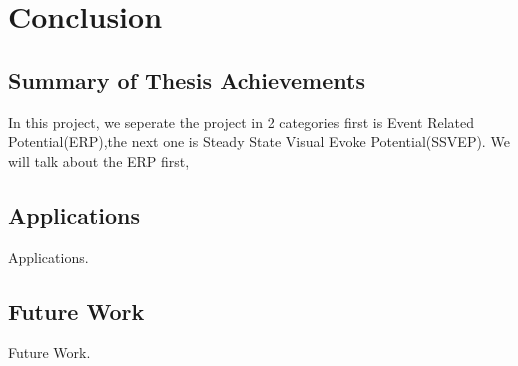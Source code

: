 \chapter{Conclusion}

\label{ch:conclusions}

\section{Summary of Thesis Achievements}

In this project, we seperate the project in 2 categories first is Event Related Potential(ERP),the next one is Steady State Visual Evoke Potential(SSVEP). We will talk about the ERP first, 


\section{Applications}

Applications.


\section{Future Work}

Future Work.